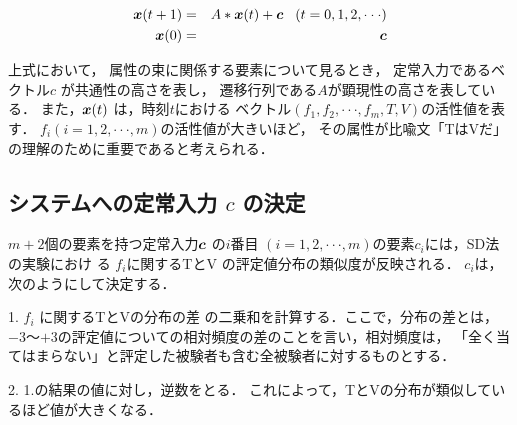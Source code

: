 \begin{eqnarray}
\mbox{\boldmath $x$}(t+1)&=& A\ast\mbox{\boldmath $x$}(t)
+\mbox{\boldmath $c$}\hspace{0.3cm}(t=0,1,2,\cdot\cdot\cdot)\\
\mbox{\boldmath $x$}(0)&=&\mbox{\boldmath $c$}
\end{eqnarray}

\noindent 上式において，
属性の束に関係する要素について見るとき，
定常入力であるベクトル\hspace{0.1cm}\mbox{\boldmath $c$}\hspace{0.1cm}
が共通性の高さを表し，
遷移行列である$A$が顕現性の高さを表している．
また，\hspace{0.1cm}$\mbox{\boldmath $x$}(t)$
は，時刻$t$における
ベクトル$(f_1,f_2,\cdot\cdot\cdot,f_m,T,V)$の活性値を表す．
$f_i$\hspace{0.1cm}$(i=1,2,\cdot\cdot\cdot,m)$の活性値が大きいほど，
その属性が比喩文「TはVだ」の理解のために重要であると考えられる．

\subsection{システムへの定常入力 {\bf $c$} の決定}

$m+2$個の要素を持つ定常入力\hspace{0.1cm}$\mbox{\boldmath $c$}$
の\hspace{0.1cm}$i$番目
\hspace{0.1cm}$(i=1,2,\cdot\cdot\cdot,m)$の要素$c_i$には，SD法の実験におけ
る
$f_i$に関するTとV
の評定値分布の類似度が反映される．
$c_i$は，
次のようにして決定する．


\newcommand{\namelistlabel}[1]{}
\newenvironment{namelist}[1]{}{}

\hspace{1cm}
\begin{namelist}{x}
 \item[\hspace{0.3cm}1.] $f_i$ \hspace{0.1cm}に関するTとVの分布の差
の二乗和を計算する．ここで，分布の差とは，
$-3$〜$+3$の評定値についての相対頻度の差のことを言い，相対頻度は，
「全く当てはまらない」と評定した被験者も含む全被験者に対するものとする．
 
 \item[\hspace{0.3cm}2.] 1.の結果の値に対し，逆数をとる．
これによって，TとVの分布が類似しているほど値が大きくなる． 
\end{namelist}



